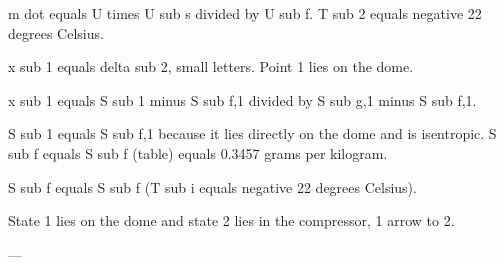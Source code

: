 m dot equals U times U sub s divided by U sub f.  
T sub 2 equals negative 22 degrees Celsius.  

x sub 1 equals delta sub 2, small letters.  
Point 1 lies on the dome.  

x sub 1 equals S sub 1 minus S sub f,1 divided by S sub g,1 minus S sub f,1.  

S sub 1 equals S sub f,1 because it lies directly on the dome and is isentropic.  
S sub f equals S sub f (table) equals 0.3457 grams per kilogram.  

S sub f equals S sub f (T sub i equals negative 22 degrees Celsius).  

State 1 lies on the dome and state 2 lies in the compressor, 1 arrow to 2.  

---